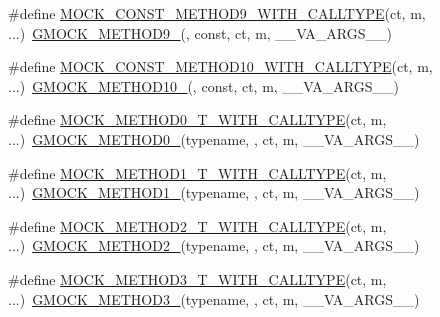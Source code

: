 \begin{DoxyCompactItemize}
\item 
\#define \hyperlink{gmock-generated-function-mockers_8h_ad422a4d4cb5e3b91478e66a26c2af63e}{M\+O\+C\+K\+\_\+\+C\+O\+N\+S\+T\+\_\+\+M\+E\+T\+H\+O\+D9\+\_\+\+W\+I\+T\+H\+\_\+\+C\+A\+L\+L\+T\+Y\+PE}(ct,  m, ...)~\hyperlink{gmock-generated-function-mockers_8h_aa820171a19cc587c247dbe05cbffc55f}{G\+M\+O\+C\+K\+\_\+\+M\+E\+T\+H\+O\+D9\+\_\+}(, const, ct, m, \+\_\+\+\_\+\+V\+A\+\_\+\+A\+R\+G\+S\+\_\+\+\_\+)
\item 
\#define \hyperlink{gmock-generated-function-mockers_8h_a484ce7e8fbcc26b5145e893b48e7cd7d}{M\+O\+C\+K\+\_\+\+C\+O\+N\+S\+T\+\_\+\+M\+E\+T\+H\+O\+D10\+\_\+\+W\+I\+T\+H\+\_\+\+C\+A\+L\+L\+T\+Y\+PE}(ct,  m, ...)~\hyperlink{gmock-generated-function-mockers_8h_a81a48223a8771de36ef92ac6d56f6e81}{G\+M\+O\+C\+K\+\_\+\+M\+E\+T\+H\+O\+D10\+\_\+}(, const, ct, m, \+\_\+\+\_\+\+V\+A\+\_\+\+A\+R\+G\+S\+\_\+\+\_\+)
\item 
\#define \hyperlink{gmock-generated-function-mockers_8h_a68a3dcece1b6932b4dbda2216ff4fa90}{M\+O\+C\+K\+\_\+\+M\+E\+T\+H\+O\+D0\+\_\+\+T\+\_\+\+W\+I\+T\+H\+\_\+\+C\+A\+L\+L\+T\+Y\+PE}(ct,  m, ...)~\hyperlink{gmock-generated-function-mockers_8h_ae0d290ffa58d7c624b2e3487ba1252f4}{G\+M\+O\+C\+K\+\_\+\+M\+E\+T\+H\+O\+D0\+\_\+}(typename, , ct, m, \+\_\+\+\_\+\+V\+A\+\_\+\+A\+R\+G\+S\+\_\+\+\_\+)
\item 
\#define \hyperlink{gmock-generated-function-mockers_8h_a3028c1938f6b819b64400c426ef1e30d}{M\+O\+C\+K\+\_\+\+M\+E\+T\+H\+O\+D1\+\_\+\+T\+\_\+\+W\+I\+T\+H\+\_\+\+C\+A\+L\+L\+T\+Y\+PE}(ct,  m, ...)~\hyperlink{gmock-generated-function-mockers_8h_a1bc0012d62440dda77208dabdf4925c9}{G\+M\+O\+C\+K\+\_\+\+M\+E\+T\+H\+O\+D1\+\_\+}(typename, , ct, m, \+\_\+\+\_\+\+V\+A\+\_\+\+A\+R\+G\+S\+\_\+\+\_\+)
\item 
\#define \hyperlink{gmock-generated-function-mockers_8h_a18e4e8da0bdf27bde5ffca30587ff074}{M\+O\+C\+K\+\_\+\+M\+E\+T\+H\+O\+D2\+\_\+\+T\+\_\+\+W\+I\+T\+H\+\_\+\+C\+A\+L\+L\+T\+Y\+PE}(ct,  m, ...)~\hyperlink{gmock-generated-function-mockers_8h_a885295ca6bebb15efb3fc786218c5d47}{G\+M\+O\+C\+K\+\_\+\+M\+E\+T\+H\+O\+D2\+\_\+}(typename, , ct, m, \+\_\+\+\_\+\+V\+A\+\_\+\+A\+R\+G\+S\+\_\+\+\_\+)
\item 
\#define \hyperlink{gmock-generated-function-mockers_8h_a1e723cc1c62c9fedb9f54ee30c111047}{M\+O\+C\+K\+\_\+\+M\+E\+T\+H\+O\+D3\+\_\+\+T\+\_\+\+W\+I\+T\+H\+\_\+\+C\+A\+L\+L\+T\+Y\+PE}(ct,  m, ...)~\hyperlink{gmock-generated-function-mockers_8h_af7c77ba511c631de02bb8c45a6ed3045}{G\+M\+O\+C\+K\+\_\+\+M\+E\+T\+H\+O\+D3\+\_\+}(typename, , ct, m, \+\_\+\+\_\+\+V\+A\+\_\+\+A\+R\+G\+S\+\_\+\+\_\+)

\end{DoxyCompactItemize}
